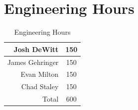 \section{Engineering Hours}

\begin{table}[ht] 
\caption{Engineering Hours}
	\label{table:engineeringhoursl}
	\centering 
\begin{tabular}{|r|c|}
	
	\hline Josh DeWitt&150\\ \hline
	James Gehringer&150\\ \hline
	Evan Milton&150\\ \hline
	Chad Staley&150\\ \hline
	Total&600\\ \hline
\end{tabular}
\end{table} 
